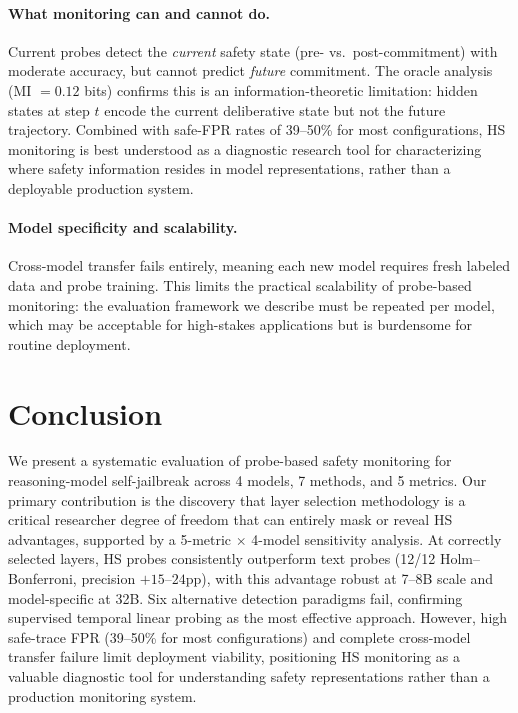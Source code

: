 \documentclass[11pt,a4paper]{article}
\newcommand{\pp}{\text{pp}}
\begin{document}
\paragraph{What monitoring can and cannot do.}
Current probes detect the \emph{current} safety state (pre- vs.\ post-commitment) with moderate accuracy, but cannot predict \emph{future} commitment.
The oracle analysis (MI $= 0.12$ bits) confirms this is an information-theoretic limitation: hidden states at step $t$ encode the current deliberative state but not the future trajectory.
Combined with safe-FPR rates of 39--50\% for most configurations, HS monitoring is best understood as a diagnostic research tool for characterizing where safety information resides in model representations, rather than a deployable production system.

\paragraph{Model specificity and scalability.}
Cross-model transfer fails entirely, meaning each new model requires fresh labeled data and probe training.
This limits the practical scalability of probe-based monitoring: the evaluation framework we describe must be repeated per model, which may be acceptable for high-stakes applications but is burdensome for routine deployment.

\section{Conclusion}

We present a systematic evaluation of probe-based safety monitoring for reasoning-model self-jailbreak across 4 models, 7 methods, and 5 metrics.
Our primary contribution is the discovery that layer selection methodology is a critical researcher degree of freedom that can entirely mask or reveal HS advantages, supported by a 5-metric $\times$ 4-model sensitivity analysis.
At correctly selected layers, HS probes consistently outperform text probes (12/12 Holm--Bonferroni, precision $+15$--$24\pp$), with this advantage robust at 7--8B scale and model-specific at 32B.
Six alternative detection paradigms fail, confirming supervised temporal linear probing as the most effective approach.
However, high safe-trace FPR (39--50\% for most configurations) and complete cross-model transfer failure limit deployment viability, positioning HS monitoring as a valuable diagnostic tool for understanding safety representations rather than a production monitoring system.
\end{document}

